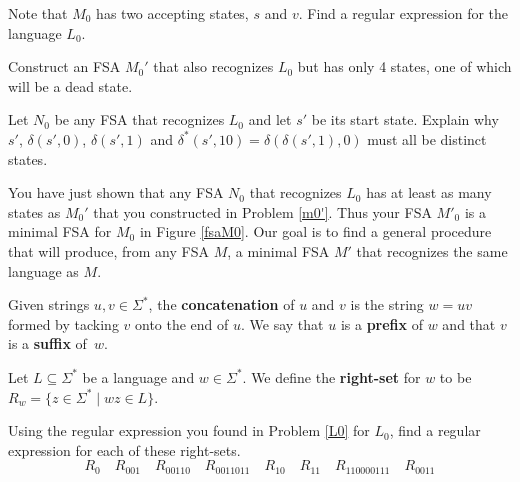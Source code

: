 \begin{prb}
\label{L0}
Note that $M_0$ has two accepting states, $s$ and $v$. Find a regular expression for the language $L_0$.\begin{annotation}
\end{annotation}
\end{prb}


\begin{prb} \label{m0'}
Construct an FSA $M_0'$ that also recognizes $L_0$ but has only 4 states, one of which will be a dead state.
\end{prb}

\begin{prb}\label{4states}
Let $N_0$ be any FSA that recognizes $L_0$ and let $s'$ be its start state. Explain why $s'$, $\delta(s',0)$, $\delta(s',1)$ and $\delta^*(s',10)=\delta(\delta(s',1),0)$ must all be distinct states.
\end{prb}

You have just shown that any FSA $N_0$ that recognizes $L_0$ has at least as many states as $M_0'$ that you constructed in Problem \ref{m0'}.  Thus your FSA $M'_0$ is a minimal FSA for $M_0$ in Figure \ref{fsaM0}.  Our goal is to find a general procedure that will produce, from any FSA $M$, a minimal FSA $M'$ that recognizes the same language as $M$.

\begin{dfn}
Given strings $u,v\in \Sigma^*$, the \textbf{concatenation} of $u$ and $v$ is the string $w = uv$ formed by tacking $v$ onto the end of $u$.  We say that $u$ is a \textbf{prefix} of $w$ and that $v$ is a \textbf{suffix} of~$w$.
\end{dfn}

\begin{dfn}
Let $L \subseteq \Sigma^*$ be a language and $w \in \Sigma^*$. We define
the \textbf{right-set} for $w$ to be $R_w = \{z\in \Sigma^* \mid wz\in L\}$.
\end{dfn}

\begin{prb}\label{right-sets}
Using the regular expression you found in Problem \ref{L0} for $L_0$, find a regular expression for each of these right-sets.
\[
R_0\quad R_{001}\quad  R_{00110}\quad  R_{0011011}\quad  R_{10}\quad   R_{11}\quad  R_{110000111}\quad  R_{0011}
\]
\end{prb}

